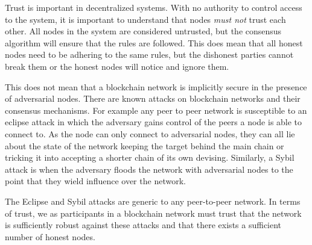Trust is important in decentralized systems. With no authority to control access to the system, it is important to understand that nodes \emph{must not} trust each other. All nodes in the system are considered untrusted, but the consensus algorithm will ensure that the rules are followed. This does mean that all honest nodes need to be adhering to the same rules, but the dishonest parties cannot break them or the honest nodes will notice and ignore them.

This does not mean that a blockchain network is implicitly secure in the presence of adversarial nodes. There are known attacks on blockchain networks and their consensus mechanisms. For example any peer to peer network is susceptible to an eclipse attack \cite{heilman_eclipse_2015} in which the adversary gains control of the peers a node is able to connect to. As the node can only connect to adversarial nodes, they can all lie about the state of the network keeping the target behind the main chain or tricking it into accepting a shorter chain of its own devising. Similarly, a Sybil attack \cite{douceur_sybil_2002} is when the adversary floods the network with adversarial nodes to the point that they wield influence over the network.

The Eclipse and Sybil attacks are generic to any peer-to-peer network. In terms of trust, we as participants in a blockchain network must trust that the network is sufficiently robust against these attacks and that there exists a sufficient number of honest nodes.

